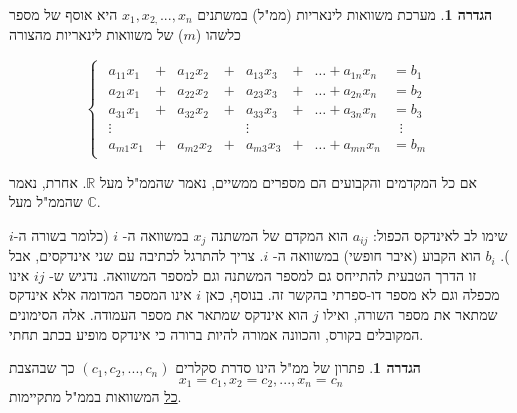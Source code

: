 \documentclass[12pt]{report}
\theoremstyle{plain}
\theoremstyle{definition}
\newtheorem{definition}[theorem]{הגדרה}
\newcommand{\R}{\mathbb{R}}
\newcommand{\C}{\mathbb{C}}
\newcommand{\0}{\mathbf{0}}
\begin{document}
\begin{definition}
מערכת משוואות לינאריות (ממ"ל) במשתנים
$x_1,x_{2,}...,x_n$
היא אוסף של מספר כלשהו ($m$) של משוואות לינאריות מהצורה

\begin{equation}\label{eqn:linear-eqs}
\begin{cases}
\begin{alignedat}{7}
a_{11}x_1 &{}+{}& a_{12}x_2 &{}+{}& a_{13}x_3 &{}+{}& \dots + a_{1n}x_n &= b_1 \\[4pt]
a_{21}x_1 &{}+{}& a_{22}x_2 &{}+{}& a_{23}x_3 &{}+{}& \dots + a_{2n}x_n &= b_2 \\[4pt]
a_{31}x_1 &{}+{}& a_{32}x_2 &{}+{}& a_{33}x_3 &{}+{}& \dots + a_{3n}x_n &= b_3 \\[4pt]
\vdots& & & & \vdots & & & \;\;\vdots \\[4pt]
a_{m1}x_1 &{}+{}& a_{m2}x_2 &{}+{}& a_{m3}x_3 &{}+{}& \dots + a_{mn}x_n &= b_m
\end{alignedat}
\end{cases}
\end{equation}

אם כל המקדמים והקבועים הם מספרים ממשיים,
נאמר שהממ"ל
מעל $\R$.
אחרת, נאמר שהממ"ל מעל
$\C$.
\end{definition}

שימו לב לאינדקס הכפול:
$a_{ij}$
הוא המקדם של המשתנה
$x_{j}$
במשוואה ה-
$i$
(כלומר בשורה ה-$i$).
$b_{i}$
הוא הקבוע (איבר חופשי) במשוואה ה-
$i$.
צריך להתרגל לכתיבה עם שני אינדקסים, אבל זו הדרך הטבעית להתייחס גם למספר המשתנה וגם למספר המשוואה. נדגיש ש-
$ij$
אינו מכפלה וגם לא מספר דו-ספרתי בהקשר זה. בנוסף, כאן
$i$
אינו המספר המדומה אלא אינדקס שמתאר את מספר השורה, ואילו 
$j$
הוא אינדקס שמתאר את מספר העמודה. אלה הסימונים המקובלים בקורס, והכוונה אמורה להיות ברורה כי אינדקס מופיע בכתב תחתי.

\begin{definition}
פתרון של ממ"ל הינו סדרת סקלרים
$(c_1,c_2,...,c_n)$
כך שבהצבת 
$$
x_1=c_1,x_2=c_2,...,x_n=c_n
$$
\underline{כל}
המשוואות בממ"ל מתקיימות.      
\end{definition}
\end{document}
